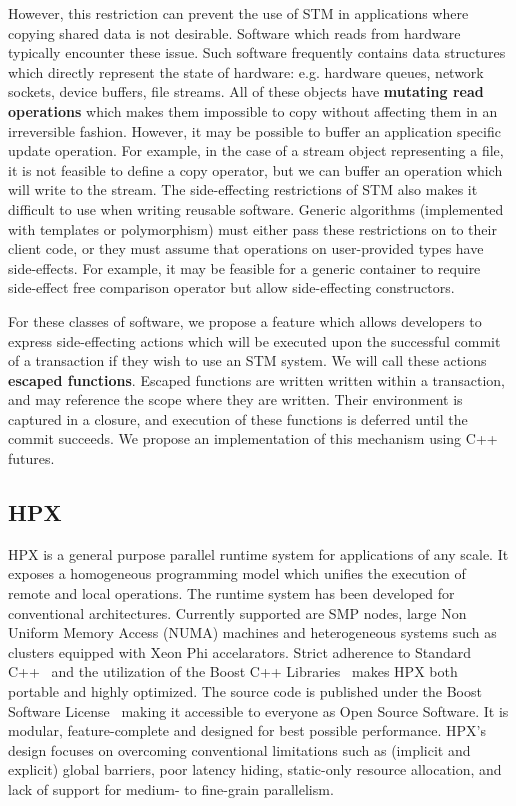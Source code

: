 \documentclass[conference]{IEEEtran}
\begin{document}
However, this restriction can prevent the use of STM in applications where copying shared data is not desirable. Software which reads from hardware typically encounter these issue. Such software frequently contains data structures which directly represent the state of hardware: e.g. hardware queues, network sockets, device buffers, file streams. All of these objects have \textbf{mutating read operations} which makes them impossible to copy without affecting them in an irreversible fashion. However, it may be possible to buffer an application specific update operation. For example, in the case of a stream object representing a file, it is not feasible to define a copy operator, but we can buffer an operation which will write to the stream. The side-effecting restrictions of STM also makes it difficult to use when writing reusable software. Generic algorithms (implemented with templates or polymorphism) must either pass these restrictions on to their client code, or they must assume that operations on user-provided types have side-effects. For example, it may be feasible for a generic container to require side-effect free comparison operator but allow side-effecting constructors. 

For these classes of software, we propose a feature which allows developers to express side-effecting actions which will be executed upon the successful commit of a transaction if they wish to use an STM system. We will call these actions \textbf{escaped functions}. Escaped functions are written written within a transaction, and may reference the scope where they are written. Their environment is captured in a closure, and execution of these functions is deferred until the commit succeeds. We propose an implementation of this mechanism using C++ futures.

\subsection{HPX}

HPX is a general purpose parallel runtime system for applications of any scale.
It exposes a homogeneous programming model which unifies the execution of remote
and local operations. The runtime system has been developed for conventional
architectures. Currently supported are SMP nodes, large Non Uniform Memory Access
(NUMA) machines and heterogeneous systems such as clusters equipped with Xeon Phi
accelarators. Strict adherence to Standard C++~\cite{cxx11_standard} and the
utilization of the Boost C++ Libraries~\cite{boostcpplibraries} makes HPX both
portable and highly optimized.
The source code is published under the Boost Software
License~ making it accessible to everyone as Open Source Software.
It is modular, feature-complete and designed for
best possible performance. HPX's design focuses on overcoming conventional
limitations such as (implicit and explicit) global barriers, poor latency hiding,
static-only resource allocation, and lack of support for medium- to fine-grain
parallelism.
\end{document}

